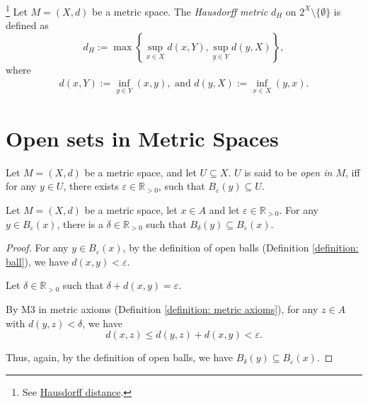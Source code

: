 \begin{example}
	\footnote{
		See \href{https://en.wikipedia.org/wiki/Hausdorff_distance}{Hausdorff distance}.
	}
	Let $M = (X, d)$ be a metric space. The \textit{Hausdorff metric} $d_H$ on $2^X \setminus \{\emptyset\}$ is defined as
	$$
	d_H := \max \left\{ \sup_{x \in X}d(x,Y), \sup_{y \in Y} d(y, X)\right\},
	$$
	where
	$$
	\begin{aligned}
		d(x,Y) := \inf_{y \in Y}(x,y), \text{ and } d(y, X) := \inf_{x \in X} (y, x).
	\end{aligned}
	$$
\end{example}


\section{Open sets in Metric Spaces}


\begin{definition}
	\label{definition: open set in metric space}
	Let $M = (X, d)$ be a metric space, and let $U \subseteq X$. $U$ is said to be \textit{open in $M$}, iff for any $y \in U$, there exists $\varepsilon \in \mathbb R_{> 0}$, such that $B_\varepsilon(y) \subseteq U$.
\end{definition}


\begin{lemma}
	\label{lemma: open balls of point inside open ball}
	Let $M = (X, d)$ be a metric space, let $x \in A$ and let $\varepsilon \in \mathbb R_{> 0}$. For any $y \in B_\varepsilon (x)$, there is a $\delta \in \mathbb R_{> 0}$ such that $B_\delta (y) \subseteq B_\varepsilon(x)$.
	
	\begin{proof}
		For any $y \in B_\varepsilon (x)$, by the definition of open balls (Definition \ref{definition: ball}), we have $d(x,y) < \varepsilon$.
		
		Let $\delta \in \mathbb R_{> 0}$ such that $\delta + d(x,y) = \varepsilon$.
		
		By M3 in metric axioms (Definition \ref{definition: metric axioms}), for any $z \in A$ with $d(y,z) < \delta$, we have
		$$
		d(x, z) \le d(y, z) + d(x, y) < \varepsilon.
		$$
		
		Thus, again, by the definition of open balls, we have $B_\delta(y) \subseteq B_\varepsilon(x)$.
		
		\qedlemma
	\end{proof}
\end{lemma}



